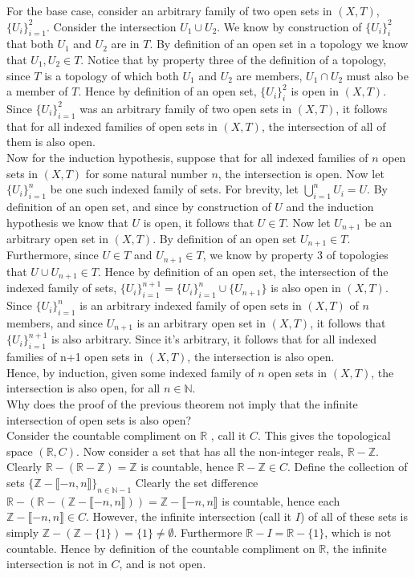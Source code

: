 \documentclass{article}
\theoremstyle{definition}
\newcommand{\R}{\mathbb{R}}
\newcommand{\Z}{\mathbb{Z}}
\newcommand{\N}{\mathbb{N}}
\begin{document}
For the base case, consider an arbitrary family of two open sets in $(X,T)$, $\{U_i\}^2_{i =1}$. Consider the intersection $U_1\cup U_2$. We know by construction of $\{U_i\}^2_i$ that both $U_1$ and $U_2$ are in $T$. By definition of an open set in a topology we know that $U_1,U_2\in T$. Notice that by property three of the definition of a topology, since $T$ is a topology of which both $U_1$ and $U_2$ are members, $U_1\cap U_2$ must also be a member of $T$. Hence by definition of an open set, $\{U_i\}^2_i$ is open in $(X,T)$. Since $\{U_i\}^2_{i =1}$ was an arbitrary family of two open sets in $(X,T)$, it follows that for all indexed families of open sets in $(X,T)$, the intersection of all of them is also open. \\

Now for the induction hypothesis, suppose that for all indexed families of $n$ open sets in $(X,T)$ for some natural number $n$, the intersection is open. Now let $\{U_i\}^n_{i = 1}$ be one such indexed family of sets. For brevity, let $\bigcup^n_{i = 1}U_i = U$. By definition of an open set, and since by construction of $U$ and the induction hypothesis we know that $U$ is open, it follows that $U\in T$. Now let $U_{n+1}$ be an arbitrary open set in $(X,T)$. By definition of an open set $U_{n+1} \in T$. Furthermore, since $U\in T$ and $U_{n+1}\in T$, we know by property 3 of topologies that $U\cup U_{n+1}\in T$. Hence by definition of an open set, the intersection of the indexed family of sets, $\{U_i\}^{n+1}_{i = 1} = \{U_i\}^{n}_{i = 1}\cup \{U_{n+1}\}$ is also open in $(X,T)$. Since $\{U_i\}^{n}_{i = 1}$ is an arbitrary indexed family of open sets in $(X,T)$ of $n$ members, and since $U_{n+1}$ is an arbitrary open set in $(X,T)$, it follows that $\{U_i\}^{n+1}_{i = 1}$ is also arbitrary. Since it's arbitrary, it follows that for all indexed families of n+1 open sets in $(X,T)$, the intersection is also open.\\

Hence, by induction, given some indexed family of $n$ open sets in $(X,T)$, the intersection is also open, for all $n\in \N$.\\

 Why does the proof of the previous theorem not imply that the infinite intersection of open sets is also open?\\
 Consider the countable compliment on $\R$ , call it $C$. This gives the topological space $(\R,C)$. Now consider a set that has all the non-integer reals, $\R - \Z$. Clearly $\R - (\R - \Z) = \Z$ is countable, hence $\R-\Z \in C$. Define the collection of sets $\{\Z - \llbracket-n,n \rrbracket\}_{n\in \N-1}$ Clearly the set difference $\R-  (\R - (\Z - \llbracket-n,n \rrbracket)) = \Z - \llbracket-n,n \rrbracket$ is countable, hence each $\Z - \llbracket-n,n \rrbracket \in C$. However, the infinite intersection (call it $I$) of all of these sets is simply $\Z - (\Z - \{1\}) = \{1\}\ne \emptyset$. Furthermore $\R - I = \R - \{1\}$, which is not countable. Hence by definition of the countable compliment on $\R$, the infinite intersection is not in $C$, and is not open.\\
\end{document}
